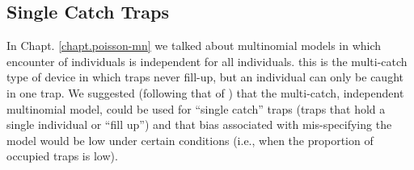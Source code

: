 \subsection{Single Catch Traps}

In Chapt. \ref{chapt.poisson-mn} we talked about multinomial models in
which encounter of individuals is independent for all
individuals. this is the multi-catch type of device in which traps
never fill-up, but an individual can only be caught in one trap. We
suggested (following that of \citet{efford_etal:2009euring}) that the
multi-catch, independent multinomial model, could be used for ``single
catch'' traps (traps that hold a single individual or ``fill up'') and
that bias associated with mis-specifying the model would be low under
certain conditions (i.e., when the proportion of occupied traps is
low).

